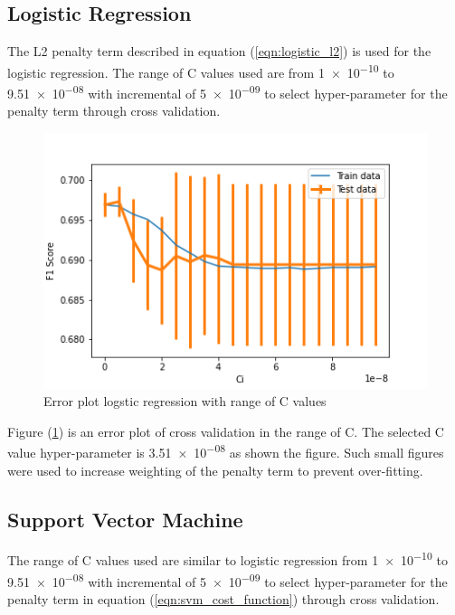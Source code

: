 \documentclass[transmag]{IEEEtran}
\begin{document}
\subsection{Logistic Regression}
\noindent The L2 penalty term described in equation (\ref{eqn:logistic_l2}) is used for the logistic regression. The range of C values used are from \num{1e-10} to \num{9.51e-08} with incremental of \num{5e-09} to select hyper-parameter for the penalty term through cross validation.

\begin{figure}[h]
	\includegraphics[width=\columnwidth]{logistic_cv_ci.png} 
    \caption{Error plot logstic regression with range of C values}%
    \label{fig:logistic_c}%
\end{figure}

\noindent Figure (\ref{fig:logistic_c}) is an error plot of cross validation in the range of C. The selected C value hyper-parameter is \num{3.51e-08} as shown the figure. Such small figures were used to increase weighting of the penalty term to prevent over-fitting.


\subsection{Support Vector Machine}
\noindent The range of C values used are similar to logistic regression from \num{1e-10} to \num{9.51e-08} with incremental of \num{5e-09} to select hyper-parameter for the penalty term in equation (\ref{eqn:svm_cost_function}) through cross validation.
\end{document}
